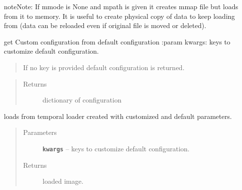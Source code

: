 \documentclass[letterpaper,10pt,english]{sphinxmanual}
\begin{document}
\begin{fulllineitems}
\begin{quote}
\begin{description}
\begin{itemize}
\end{itemize}

\end{description}\end{quote}

\begin{notice}{note}{Note:}
If mmode is None and mpath is given it creates mmap file but loads from it to memory.
It is useful to create physical copy of data to keep loading from (data can be reloaded
even if original file is moved or deleted).
\end{notice}

\begin{fulllineitems}
\label{RRtoolbox.lib:RRtoolbox.lib.image.ImLoader.getConfiguration}
get Custom configuration from default configuration
:param kwargs: keys to customize default configuration.
\begin{quote}

If no key is provided default configuration is returned.
\end{quote}
\begin{quote}\begin{description}
\item[{Returns}] \leavevmode
dictionary of configuration

\end{description}\end{quote}

\end{fulllineitems}


\begin{fulllineitems}
\label{RRtoolbox.lib:RRtoolbox.lib.image.ImLoader.temp}
loads from temporal loader created with customized and default parameters.
\begin{quote}\begin{description}
\item[{Parameters}] \leavevmode
\textbf{\texttt{kwargs}} -- keys to customize default configuration.

\item[{Returns}] \leavevmode
loaded image.

\end{description}\end{quote}

\end{fulllineitems}


\end{fulllineitems}
\end{document}
